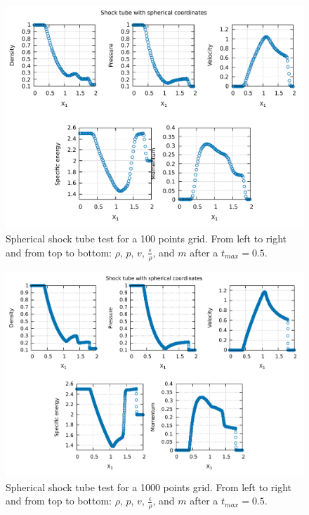 \documentclass{article}
\begin{document}
\begin{figure}[H]
	\centering
	\includegraphics[width=0.9 \linewidth]{spheshock100.pdf}
	\caption{Spherical shock tube test for a 100 points grid. From left to right and from top to bottom: $\rho$, $p$, $v$, $\frac{\epsilon}{\rho}$, and $m$ after a $t_{max}=0.5$.}
	\label{fig:spheshock100}
\end{figure}
\begin{figure}[H]
	\centering
	\includegraphics[width=0.9 \linewidth]{spheshock.pdf}
	\caption{Spherical shock tube test for a 1000 points grid. From left to right and from top to bottom: $\rho$, $p$, $v$, $\frac{\epsilon}{\rho}$, and $m$ after a $t_{max}=0.5$.}

	\label{fig:spheshock1000}
\end{figure}
\end{document}
